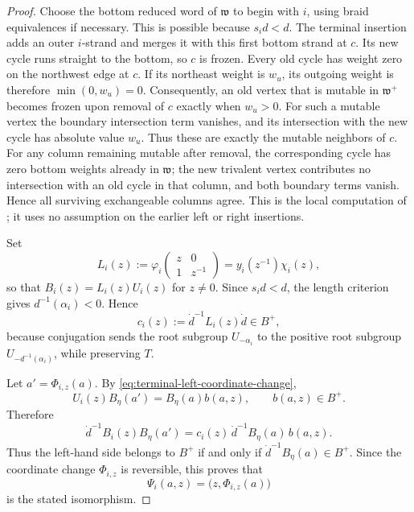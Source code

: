 \documentclass[12pt, reqno]{amsart}
\theoremstyle{plain}
\theoremstyle{definition}
\numberwithin{equation}{section}
\begin{document}
\begin{proof}
Choose the bottom reduced word of \(\mathfrak w\) to begin with \(i\),
using braid equivalences if necessary. This is possible because
\(s_i d<d\). The terminal insertion adds an outer \(i\)-strand and
merges it with this first bottom strand at \(c\). Its new cycle runs
straight to the bottom, so \(c\) is frozen. Every old cycle has weight
zero on the northwest edge at \(c\). If its northeast weight is
\(w_u\), its outgoing weight is therefore \(\min(0,w_u)=0\).
Consequently, an old vertex that is mutable in \(\mathfrak w^+\)
becomes frozen upon removal of \(c\) exactly when \(w_u>0\).
For such a mutable vertex the boundary intersection term vanishes,
and its intersection with the new cycle has absolute value \(w_u\).
Thus these are exactly the mutable neighbors of \(c\).
For any column remaining mutable after removal, the corresponding
cycle has zero bottom weights already in \(\mathfrak w\); the new
trivalent vertex contributes no intersection with an old cycle in
that column, and both boundary terms vanish. Hence all surviving
exchangeable columns agree. This is the local computation of
\cite[Definitions~4.17,~4.26 and Lemma~4.47]{casals2025cluster}; it
uses no assumption on the earlier left or right insertions.

Set
\[
L_i(z):=
\varphi_i\!\begin{pmatrix}z&0\\1&z^{-1}\end{pmatrix}
=y_i(z^{-1})\chi_i(z),
\]
so that \(B_i(z)=L_i(z)U_i(z)\) for \(z\neq0\). Since
\(s_i d<d\), the length criterion gives
\(d^{-1}(\alpha_i)<0\). Hence
\[
c_i(z):=\dot d^{-1}L_i(z)\dot d\in B^+,
\]
because conjugation sends the root subgroup
\(U_{-\alpha_i}\) to the positive root subgroup
\(U_{-d^{-1}(\alpha_i)}\), while preserving \(T\).

Let \(a'=\Phi_{i,z}(a)\). By
\eqref{eq:terminal-left-coordinate-change},
\[
U_i(z)B_\eta(a')=B_\eta(a)b(a,z),
\qquad b(a,z)\in B^+.
\]
Therefore
\[
\dot d^{-1}B_i(z)B_\eta(a')
=
c_i(z)\,\dot d^{-1}B_\eta(a)\,b(a,z).
\]
Thus the left-hand side belongs to \(B^+\) if and only if
\(\dot d^{-1}B_\eta(a)\in B^+\). Since the coordinate change
\(\Phi_{i,z}\) is reversible, this proves that
\[
\Psi_i(a,z)=\bigl(z,\Phi_{i,z}(a)\bigr)
\]
is the stated isomorphism.


\end{proof}
\end{document}
